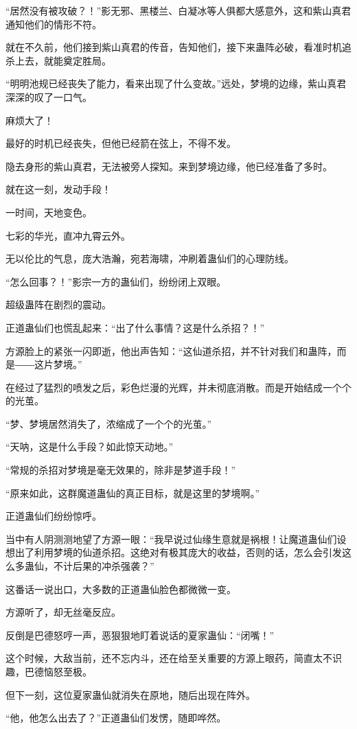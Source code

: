 \begin{this_body}
“居然没有被攻破？！”影无邪、黑楼兰、白凝冰等人俱都大感意外，这和紫山真君通知他们的情形不符。

就在不久前，他们接到紫山真君的传音，告知他们，接下来蛊阵必破，看准时机追杀上去，就能奠定胜局。

“明明池规已经丧失了能力，看来出现了什么变故。”远处，梦境的边缘，紫山真君深深的叹了一口气。

麻烦大了！

最好的时机已经丧失，但他已经箭在弦上，不得不发。

隐去身形的紫山真君，无法被旁人探知。来到梦境边缘，他已经准备了多时。

就在这一刻，发动手段！

一时间，天地变色。

七彩的华光，直冲九霄云外。

无以伦比的气息，庞大浩瀚，宛若海啸，冲刷着蛊仙们的心理防线。

“怎么回事？！”影宗一方的蛊仙们，纷纷闭上双眼。

超级蛊阵在剧烈的震动。

正道蛊仙们也慌乱起来：“出了什么事情？这是什么杀招？！”

方源脸上的紧张一闪即逝，他出声告知：“这仙道杀招，并不针对我们和蛊阵，而是――这片梦境。”

在经过了猛烈的喷发之后，彩色烂漫的光辉，并未彻底消散。而是开始结成一个个的光茧。

“梦、梦境居然消失了，浓缩成了一个个的光茧。”

“天呐，这是什么手段？如此惊天动地。”

“常规的杀招对梦境是毫无效果的，除非是梦道手段！”

“原来如此，这群魔道蛊仙的真正目标，就是这里的梦境啊。”

正道蛊仙们纷纷惊呼。

当中有人阴测测地望了方源一眼：“我早说过仙缘生意就是祸根！让魔道蛊仙们设想出了利用梦境的仙道杀招。这绝对有极其庞大的收益，否则的话，怎么会引发这么多蛊仙，不计后果的冲杀强袭？”

这番话一说出口，大多数的正道蛊仙脸色都微微一变。

方源听了，却无丝毫反应。

反倒是巴德怒哼一声，恶狠狠地盯着说话的夏家蛊仙：“闭嘴！”

这个时候，大敌当前，还不忘内斗，还在给至关重要的方源上眼药，简直太不识趣，巴德恼怒至极。

但下一刻，这位夏家蛊仙就消失在原地，随后出现在阵外。

“他，他怎么出去了？”正道蛊仙们发愣，随即哗然。


\end{this_body}
